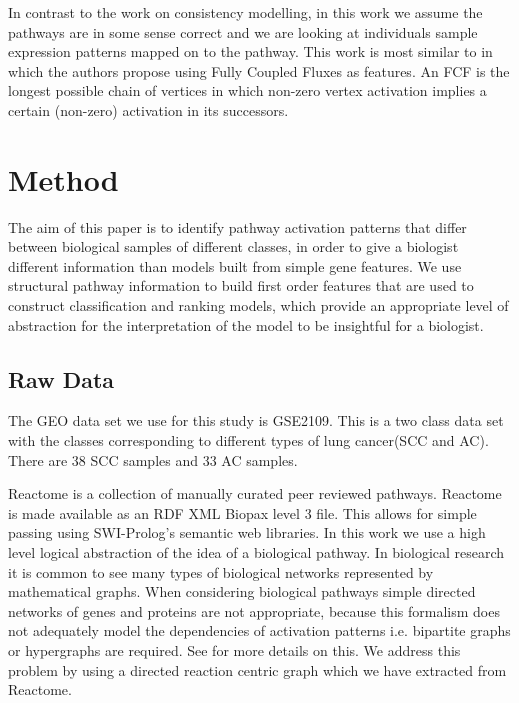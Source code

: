 \documentclass[runningheads,a4paper]{llncs}
\begin{document}
In contrast to the work on consistency modelling, in this work we assume the pathways are in some sense correct and we are looking at individuals sample expression patterns mapped on to the pathway. This work is most similar to  \citep{holec2008using} in which the authors propose using Fully Coupled Fluxes as features. An FCF is the longest possible chain of vertices in which non-zero vertex activation implies a certain (non-zero) activation in its successors.

%

	  
\section{Method}
The aim of this paper is to identify pathway activation patterns that differ between biological samples of different classes, in order to give a biologist different information than models built from simple gene features. We use structural pathway information to build first order features that are used to construct classification and ranking models, which  provide an appropriate level of abstraction for the interpretation of the model to be insightful for a biologist. 
\subsection{Raw Data}
The GEO data set we use for this study is GSE2109. This is a two class data set with the classes corresponding to different types of lung cancer(SCC and AC). There are 38 SCC samples and 33 AC samples. 
	
Reactome \citep{croft_reactome_2013} is a collection of manually curated peer reviewed pathways. Reactome is made available as an RDF XML Biopax level 3 file. This allows for simple passing using SWI-Prolog's semantic web libraries. 
In this work we use a high level logical abstraction of the idea of a biological pathway. In biological research it is common to see many types of biological networks represented by mathematical graphs. When considering biological pathways simple directed networks of genes and proteins are not appropriate, because this formalism does not adequately model the dependencies of activation patterns i.e. bipartite graphs or hypergraphs are required. See \citep{whelan2011representation} for more details on this. We address this problem by using a directed reaction centric graph which we have extracted from Reactome.
\end{document}
